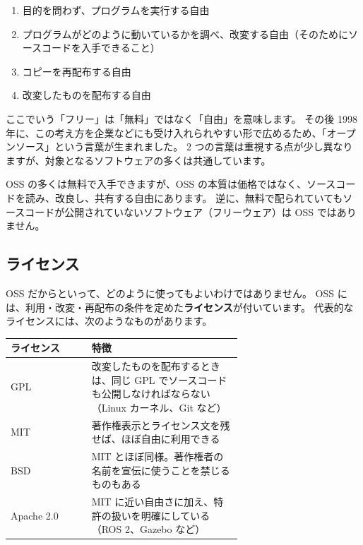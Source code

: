 \begin{enumerate}
  \item 目的を問わず、プログラムを実行する自由
  \item プログラムがどのように動いているかを調べ、改変する自由（そのためにソースコードを入手できること）
  \item コピーを再配布する自由
  \item 改変したものを配布する自由
\end{enumerate}

ここでいう「フリー」は「無料」ではなく「自由」を意味します。
その後 1998 年に、この考え方を企業などにも受け入れられやすい形で広めるため、「オープンソース」という言葉が生まれました。
2 つの言葉は重視する点が少し異なりますが、対象となるソフトウェアの多くは共通しています。

\begin{point}
  OSS の多くは無料で入手できますが、OSS の本質は価格ではなく、ソースコードを読み、改良し、共有する自由にあります。
  逆に、無料で配られていてもソースコードが公開されていないソフトウェア（フリーウェア）は OSS ではありません。
\end{point}

\subsection{ライセンス}

OSS だからといって、どのように使ってもよいわけではありません。
OSS には、利用・改変・再配布の条件を定めた\textbf{ライセンス}が付いています。
代表的なライセンスには、次のようなものがあります。

\begin{tablebox}
  \begin{tabular}{lp{0.65\linewidth}}
    \toprule
    ライセンス & 特徴 \\
    \midrule
    GPL & 改変したものを配布するときは、同じ GPL でソースコードも公開しなければならない（Linux カーネル、Git など） \\
    MIT & 著作権表示とライセンス文を残せば、ほぼ自由に利用できる \\
    BSD & MIT とほぼ同様。著作権者の名前を宣伝に使うことを禁じるものもある \\
    Apache 2.0 & MIT に近い自由さに加え、特許の扱いを明確にしている（ROS 2、Gazebo など） \\
    \bottomrule
  \end{tabular}
\end{tablebox}

